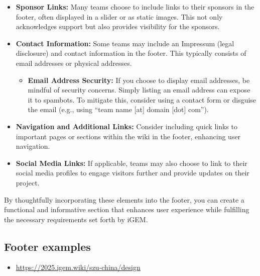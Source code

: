 \begin{itemize}
    \item \textbf{Sponsor Links:} 
    Many teams choose to include links to their sponsors in the footer, often displayed in a slider or as static images.
    This not only acknowledges support but also provides visibility for the sponsors.

    \item \textbf{Contact Information:}
    Some teams may include an Impressum (legal disclosure) and contact information in the footer.
    This typically consists of email addresses or physical addresses.
    \begin{itemize}
        \item \textbf{Email Address Security:}
        If you choose to display email addresses, be mindful of security concerns.
        Simply listing an email address can expose it to spambots.
        To mitigate this, consider using a contact form or disguise the email (e.g., using ``team name [at] domain [dot]
        com'').
    \end{itemize}



    \item \textbf{Navigation and Additional Links:}
    Consider including quick links to important pages or sections within the wiki in the footer, enhancing user navigation.

    \item \textbf{Social Media Links:}
    If applicable, teams may also choose to link to their social media profiles to engage visitors further and provide updates on their project.

\end{itemize}
By thoughtfully incorporating these elements into the footer, you can create a functional and informative section that enhances user experience while fulfilling the necessary requirements set forth by iGEM\@.

\subsection{Footer examples}\label{subsec:footer-examples}
\begin{itemize}
    \item \url{https://2025.igem.wiki/szu-china/design}
\end{itemize}


